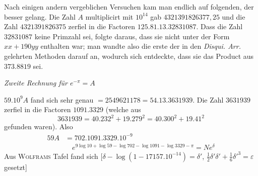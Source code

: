 Nach einigen andern vergeblichen Versuchen kam man endlich auf folgenden,
der besser gelang. Die Zahl $A$ multiplicirt mit $10^{14}$ gab $4321391826377,25$
und die Zahl $4321391826375$ zerfiel in die Factoren $125.81.13.32831087$. Dass
die Zahl $32831087$ keine Primzahl sei, folgte daraus, dass sie nicht unter der
Form $xx+190yy$ enthalten war; man wandte also die erste der in den \textit{Disqui. Arr.}
gelehrten Methoden darauf an, wodurch sich entdeckte, dass sie das Product
aus $373.8819$ sei.

\begin{center}\textit{Zweite Rechnung für $e^{-\pi}=A$}\end{center}

$59.10^9A$ fand sich sehr genau $=2549621178=54.13.3631939$. Die Zahl
$3631939$ zerfiel in die Factoren $1091.3329$ (welche aus
\[
3631939=40.232^2+19.279^2=40.300^2+19.41^2
\]
gefunden waren). Also
\[
\begin{aligned}59A&=702.1091.3329.10^{-9}\\[7pt]&\quad{}e^{9\log10+\log59-\log702-\log1091-\log3329-\pi}=Ne^\delta\end{aligned}
\]
Aus \textsc{Wolframs} Tafel fand sich [$\delta-\log(1-17157.10^{-14})=\delta'$,
$\frac12\delta'\delta'+\frac16\delta'^3=\varepsilon$ gesetzt]
